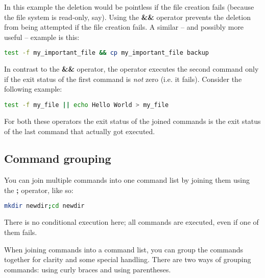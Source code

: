 In this example the deletion would be pointless if the file creation fails
(because the file system is read-only, say). Using the \textbf{\&\&} operator
prevents the deletion from being attempted if the file creation fails. A
similar -- and possibly more useful -- example is this:
\lstset{basicstyle=\scriptsize, numbers=left, captionpos=b, tabsize=4}
\begin{lstlisting}[caption=Check if a file exists and make a backup copy if it does,language={bash},
breaklines=true,xleftmargin=15pt,label=lst:Check if a file exists and make a backup copy if it does]
test -f my_important_file && cp my_important_file backup
\end{lstlisting}

In contrast to the \textbf{\&\&} operator, the \textbf{\textbar{}\textbar{}}
operator executes the second command only if the exit status of the first
command is \emph{not} zero (i.e. it fails). Consider the following example:
\lstset{basicstyle=\scriptsize, numbers=left, captionpos=b, tabsize=4}
\begin{lstlisting}[caption=Make sure we do not overwrite a file; create a new file only if it doesn't exist yet,language={bash},
breaklines=true,xleftmargin=15pt,label=lst:Make sure we do not overwrite a file; create a new file only if it doesn't exist yet]
test -f my_file || echo Hello World > my_file
\end{lstlisting}

For both these operators the exit status of the joined commands is the exit
status of the last command that actually got executed.

\subsection{Command grouping}
You can join multiple commands into one command list by joining them using the
\textbf{;} operator, like so:
\lstset{basicstyle=\scriptsize, numbers=left, captionpos=b, tabsize=4}
\begin{lstlisting}[caption=Create a directory and change into it all in one go,language={bash},
breaklines=true,xleftmargin=15pt,label=lst:Create a directory and change into it all in one go]
mkdir newdir;cd newdir
\end{lstlisting}

There is no conditional execution here; all commands are executed, even if one
of them fails.

When joining commands into a command list, you can group the commands together
for clarity and some special handling. There are two ways of grouping commands:
using curly braces and using parentheses.

